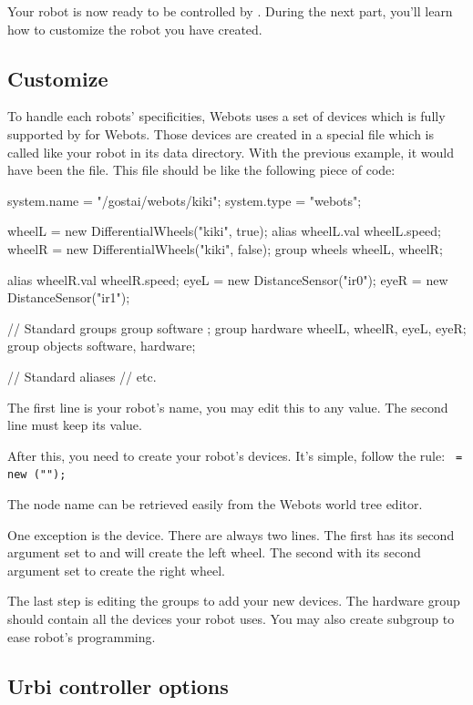 Your robot is now ready to be controlled by \urbi. During the next
part, you'll learn how to customize the robot you have created.


\subsection{Customize}

To handle each robots' specificities, Webots uses a set of devices
which is fully supported by \urbi for Webots. Those devices are
created in a special file which is called like your robot in its data
directory.  With the previous example, it would have been the
 file. This file should be like the following
piece of code:

\begin{urbifixme}
system.name = "/gostai/webots/kiki";
system.type = "webots";


wheelL = new DifferentialWheels("kiki", true);
alias wheelL.val wheelL.speed;
wheelR = new DifferentialWheels("kiki", false);
group wheels {wheelL, wheelR};

alias wheelR.val wheelR.speed;
eyeL = new DistanceSensor("ir0");
eyeR = new DistanceSensor("ir1");

// Standard groups
group software {};
group hardware {wheelL, wheelR, eyeL, eyeR};
group objects {software, hardware};

// Standard aliases
// etc.
\end{urbifixme}

The first line is your robot's name, you may edit this to any value.
The second line must keep its value.

After this, you need to create your robot's devices. It's simple,
follow the rule: \texttt{ = new
  (""); }

The node name can be retrieved easily from the Webots world tree
editor.

One exception is the  device.  There are
always two lines. The first has its second argument set to 
and will create the left wheel. The second with its second argument
set to  create the right wheel.

The last step is editing the groups to add your new devices. The
hardware group should contain all the devices your robot uses. You may
also create subgroup to ease robot's programming.


\subsection{Urbi controller options}

